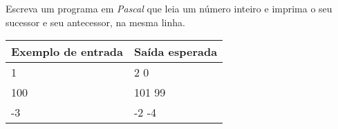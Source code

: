 \item Escreva um programa em \emph{Pascal} que leia um número inteiro e 
imprima o seu sucessor e seu antecessor, na mesma linha.

\begin{center}
\begin{tabular}{|l|l|} \hline
Exemplo de entrada & Saída esperada \\ \hline
1               & 2 0 \\ \hline
100             & 101 99 \\ \hline
-3              & -2 -4 \\ \hline
\end{tabular}
\end{center}